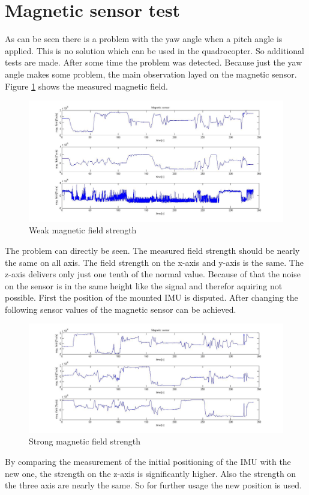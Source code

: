 \section{Magnetic sensor test}
\label{sec:MagSensTest}
As can be seen there is a problem with the yaw angle when a pitch angle is applied. This is no solution which can be used in the quadrocopter. So additional tests are made. After some time the problem was detected. Because just the yaw angle makes some problem, the main observation layed on the magnetic sensor. Figure \ref{fig:field_weak} shows the measured magnetic field.
\begin{figure}[H]
	\centering\includegraphics[width=1.0\textwidth]{fig/field_weak}
	\caption{Weak magnetic field strength}
	\label{fig:field_weak}
\end{figure}
The problem can directly be seen. The measured field strength should be nearly the same on all axis. The field strength on the x-axis and y-axis is the same. The z-axis delivers only just one tenth of the normal value. Because of that the noise on the sensor is in the same height like the signal and therefor aquiring not possible. First the position of the mounted IMU is disputed.
After changing the following sensor values of the magnetic sensor can be achieved.
\begin{figure}[H]
	\centering\includegraphics[width=1.0\textwidth]{fig/field_strong}
	\caption{Strong magnetic field strength}
	\label{fig:field_strong}
\end{figure}
By comparing the measurement of the initial positioning of the IMU with the new one, the strength on the z-axis is significantly higher. Also the strength on the three axis are nearly the same. So for further usage the new position is used. 


